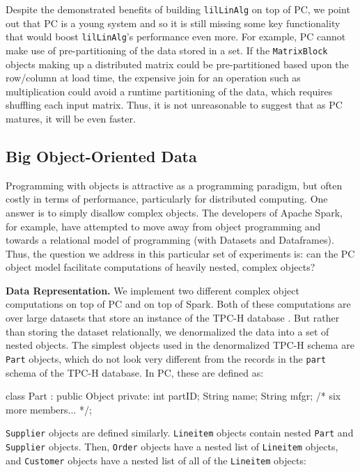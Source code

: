 Despite the demonstrated benefits of building \texttt{lilLinAlg} on top of PC, we point out that
PC is a young system and so it is still missing some key functionality that would boost
\texttt{lilLinAlg}'s performance even more.  For example, PC cannot make use of pre-partitioning of the data stored in a set. 
If the
\texttt{MatrixBlock} objects making up a distributed
matrix could be pre-partitioned based upon the row/column at load time, the expensive join for an operation
such as multiplication could avoid a runtime partitioning of the data, which requires shuffling each input matrix.
Thus, it is not unreasonable to suggest that as PC matures, it will be even faster.

\subsection{Big Object-Oriented Data}

Programming with objects is attractive as a programming paradigm, but
often costly in terms of performance, particularly
for distributed computing.  One answer is to simply disallow complex objects.  The 
developers of Apache Spark, for example, have attempted to move away from object programming
and towards a relational model of programming (with Datasets and Dataframes).  
Thus, the question we address in this particular set of experiments is: can the PC 
object model facilitate computations of heavily nested, complex objects?

\vspace{5pt}
\noindent
\textbf{Data Representation.} We implement two different complex object computations on top of PC and on top of Spark.
Both of these computations are over large datasets that store an instance of the TPC-H database \cite{council2008tpc}.
But rather than storing the dataset relationally, we denormalized the data into a set of nested objects. 
The simplest objects used in the denormalized TPC-H schema are 
\texttt{Part} objects, which do not look very different from the records in the  \texttt{part} schema of the TPC-H database.
In PC, these are defined as:

\begin{codesmall}
class Part : public Object {
private:
   int partID;
   String name;
   String mfgr;
   /* six more members... */};
\end{codesmall}

\noindent
\texttt{Supplier} objects are defined similarly.
\texttt{Lineitem} objects contain nested \texttt{Part} and \texttt{Supplier} objects.
\noindent Then,
\texttt{Order} objects have a nested list of \texttt{Lineitem} objects, and \texttt{Customer} objects have a nested
list of all of the
\texttt{Lineitem} objects:

